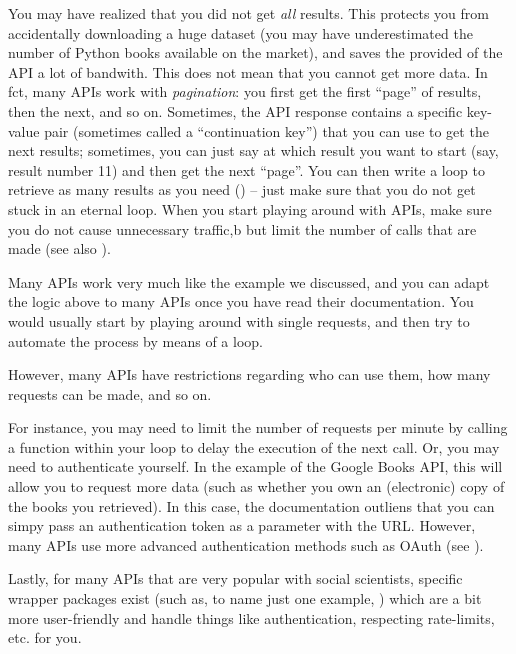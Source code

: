 
You may have realized that you did not get \emph{all} results.
This protects you from accidentally downloading a huge dataset (you
may have underestimated the number of Python books available on the
market), and saves the provided of the API a lot of bandwith.
This does not mean that you cannot get more data. In fct, many APIs work
with \emph{pagination}: you first get the first ``page'' of results,
then the next, and so on. Sometimes, the API response contains
a specific key-value pair (sometimes called a ``continuation key'')
that you can use to get the next results; sometimes, you can just
say at which result you want to start (say, result number 11) and
then get the next ``page''. You can then write a loop to retrieve
as many results as you need () -- just make sure
that you do not get stuck in an eternal loop. When you start playing
around with APIs, make sure you do not cause unnecessary traffic,b
but limit the number of calls that are made (see also ).





Many APIs work very much like the example we discussed, and you
can adapt the logic above to many APIs once you have read their
documentation. You would usually start by playing around with
single requests, and then try to automate the process by means
of a loop.

However, many APIs have restrictions regarding who can use them,
how many requests can be made, and so on.

For instance, you may need to limit the number of requests per minute
by calling a  function within your loop to delay the
execution of the next call. Or, you may need to authenticate
yourself. In the example of the Google Books API, this will
allow you to request more data (such as whether you own an
(electronic) copy of the books you retrieved). In this case,
the documentation outliens that you can simpy pass an authentication
token as a parameter with the URL. However, many APIs use
more advanced authentication methods such as OAuth (see ).

Lastly, for many APIs that are very popular with social
scientists, specific wrapper packages exist (such as, to name just one example, )
which are a bit more user-friendly and handle things like authentication,
respecting rate-limits, etc. for you.
